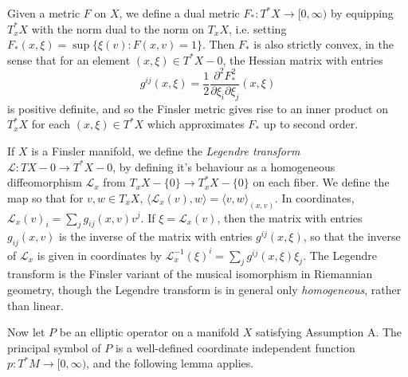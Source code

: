 
Given a metric $F$ on $X$, we define a dual metric $F_*: T^*X \to [0,\infty)$ by equipping $T_x^*X$ with the norm dual to the norm on $T_x X$, i.e. setting $F_*(x,\xi) = \sup \{ \xi(v) : F(x,v) = 1 \}$. Then $F_*$ is also strictly convex, in the sense that for an element $(x,\xi) \in T^* X - 0$, the Hessian matrix with entries
%
\begin{equation}
    g^{ij}(x,\xi) = \frac{1}{2} \frac{\partial^2 F_{\! \! *}^2}{\partial \xi_i \partial \xi_j}(x,\xi)
\end{equation}
%
is positive definite, and so the Finsler metric gives rise to an inner product on $T_x^* X$ for each $(x,\xi) \in T^* X$ which approximates $F_*$ up to second order.

If $X$ is a Finsler manifold, we define the \emph{Legendre transform} $\mathcal{L}: T X - 0 \to T^* X - 0$, by defining it's behaviour as a homogeneous diffeomorphism $\mathcal{L}_x$ from $T_x X - \{ 0 \} \to T^*_x X - \{ 0 \}$ on each fiber. We define the map so that for $v,w \in T_x X$, $\langle \mathcal{L}_x(v), w \rangle = \langle v, w \rangle_{(x,v)}$. In coordinates, $\mathcal{L}_x(v)_i = \sum\nolimits_j g_{ij}(x,v) v^j$. If $\xi = \mathcal{L}_x(v)$, then the matrix with entries $g_{ij}(x,v)$ is the inverse of the matrix with entries $g^{ij}(x,\xi)$, so that the inverse of $\mathcal{L}_x$ is given in coordinates by $\mathcal{L}_x^{-1}(\xi)^i = \sum\nolimits_j g^{ij}(x,\xi) \xi_j$. The Legendre transform is the Finsler variant of the musical isomorphism in Riemannian geometry, though the Legendre transform is in general only \emph{homogeneous}, rather than linear. %

Now let $P$ be an elliptic operator on a manifold $X$ satisfying Assumption A. The principal symbol of $P$ is a well-defined coordinate independent function $p: T^* M \to [0,\infty)$, and the following lemma applies.

